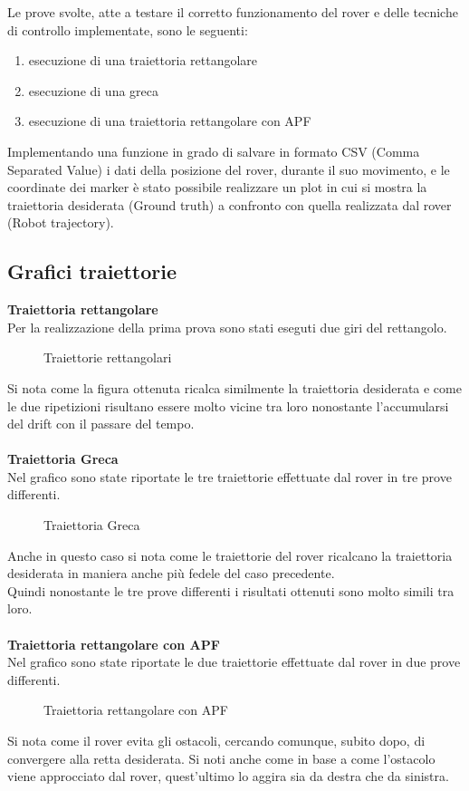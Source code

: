 \label{sec:res}
Le prove svolte, atte a testare il corretto funzionamento del rover e delle tecniche di controllo implementate, sono le seguenti:
\begin{enumerate}
  \item esecuzione di una traiettoria rettangolare 
  \item esecuzione di una greca 
  \item esecuzione di una traiettoria rettangolare con APF 
\end{enumerate}
 Implementando una funzione in grado di salvare in formato CSV (Comma Separated Value) i dati della posizione del rover, durante il suo movimento, e le coordinate dei marker è stato possibile realizzare un plot in cui si mostra la traiettoria desiderata (Ground truth) a confronto con quella realizzata dal rover (Robot trajectory).
 
\subsection{Grafici traiettorie}
\textbf{Traiettoria rettangolare}
\\Per la realizzazione della prima prova sono stati eseguti due giri del rettangolo.
\begin{figure} [H]
    \centering
    
    \caption{Traiettorie rettangolari}
    \label{fig:rect}
\end{figure} 
\noindent
Si nota come la figura ottenuta ricalca similmente la traiettoria desiderata e come le due ripetizioni risultano essere molto vicine tra loro nonostante l'accumularsi del drift con il passare del tempo.\\
\\ \textbf{Traiettoria Greca}
\\Nel grafico sono state riportate le tre traiettorie effettuate dal rover in tre prove differenti. 
\begin{figure} [H]
    \centering
    
    \caption{Traiettoria Greca}
    \label{fig:greca}
\end{figure} 
\noindent
 Anche in questo caso si nota come le traiettorie del rover ricalcano la traiettoria desiderata in maniera anche più fedele del caso precedente.
\\Quindi nonostante le tre prove differenti i risultati ottenuti sono molto simili tra loro.\\
\\ \textbf{Traiettoria rettangolare con APF}
\\Nel grafico sono state riportate le due traiettorie effettuate dal rover in due prove differenti. 
\begin{figure} [H]
    \centering
    
    \caption{Traiettoria rettangolare con APF}
    \label{fig:rectAPF}
\end{figure} 
\noindent
 Si nota come il rover evita gli ostacoli, cercando comunque, subito dopo, di convergere alla retta desiderata.
Si noti anche come in base a come l'ostacolo viene approcciato dal rover, quest'ultimo lo aggira sia da destra che da sinistra. 

